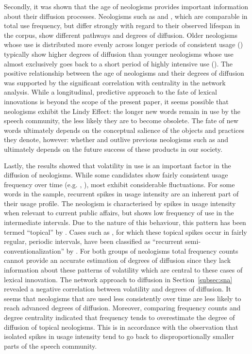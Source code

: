 \documentclass[
  a4paper,
  abstract=on,
  captions=tableabove
  ]{scrartcl}
\begin{document}
    Secondly, it was shown that the age of neologisms provides important information about their diffusion processes. Neologisms such as  and , which are comparable in total use frequency, but differ strongly with regard to their observed lifespan in the corpus, show different pathways and degrees of diffusion. Older neologisms whose use is distributed more evenly across longer periods of consistent usage () typically show higher degrees of diffusion than younger neologisms whose use almost exclusively goes back to a short period of highly intensive use (). The positive relationship between the age of neologisms and their degrees of diffusion was supported by the significant correlation with centrality in the network analysis. While a longitudinal, predictive approach to the fate of lexical innovations is beyond the scope of the present paper, it seems possible that neologisms exhibit the Lindy Effect: the longer new words remain in use by the speech community, the less likely they are to become obsolete. The fate of new words ultimately depends on the conceptual salience of the objects and practices they denote, however: whether  and  outlive previous neologisms such as  and  ultimately depends on the future success of these products in our society.

    Lastly, the results showed that volatility in use is an important factor in the diffusion of neologisms. While some candidates show fairly consistent usage frequency over time (e.g. , ), most exhibit considerable fluctuations. For some words in the sample, recurrent spikes in usage intensity are an inherent part of their usage profile. The neologism  is characterised by spikes in usage intensity when relevant to current public affairs, but shows low frequency of use in the intermediate intervals. Due to the nature of this behaviour, this pattern has been termed \enquote{topical} by \textcite{Fischer1998LexicalChange}. Cases such as , for which these topical spikes occur in fairly regular, periodic intervals, have been classified as \enquote{recurrent semi-conventionalization} by \textcite{Kerremans2015WebNew}. For both groups of neologisms total frequency counts cannot provide an accurate estimation of degrees of diffusion since they lack information about these patterns of volatility which are central to these cases of lexical innovation. The network approach to diffusion in Section~\ref{subsec:sna} revealed a negative correlation between volatility and degrees of diffusion. It seems that neologisms that are used less consistently over time are less likely to reach advanced degrees of diffusion. Moreover, comparing frequency counts and degree centrality indicated that frequency tends to overestimate the degree of diffusion of topical neologisms. This is in accordance with the observation that isolated spikes in usage intensity tend to go back to disproportionally smaller parts of the speech community.
\end{document}
